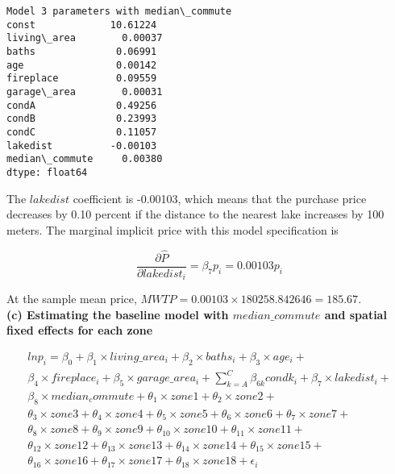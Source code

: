 \documentclass[11pt]{article}
\begin{document}
    \begin{Verbatim}[commandchars=\\\{\}]
Model 3 parameters with median\_commute
const             10.61224
living\_area        0.00037
baths              0.06991
age                0.00142
fireplace          0.09559
garage\_area        0.00031
condA              0.49256
condB              0.23993
condC              0.11057
lakedist          -0.00103
median\_commute     0.00380
dtype: float64

    \end{Verbatim}

    The \(lakedist\) coefficient is -0.00103, which means that the purchase
price decreases by 0.10 percent if the distance to the nearest lake
increases by 100 meters. The marginal implicit price with this model
specification is

\begin{equation}
\frac{\partial \widehat{P}}{\partial lakedist_i} = \beta_7 p_i = 0.00103 p_i
\end{equation}

 At the sample mean price,
\(MWTP = 0.00103 \times 180258.842646 = 185.67\).\\

    \textbf{(c) Estimating the baseline model with \(median\_commute\) and spatial fixed
effects for each zone}

\begin{multline*}
ln p_i = \beta_0 + \beta_1 \times living\_area_i + 
\beta_2 \times baths_i + \beta_3 \times age_i + \\
\beta_4 \times fireplace_i + \beta_5 \times garage\_area_i +
\sum_{k=A}^{C} \beta_{6k}condk_i + \beta_7 \times lakedist_i +\\
\beta_8 \times median_commute + 
\theta_1 \times zone1 +\theta_2 \times zone2 +\\
\theta_3 \times zone3+\theta_4 \times zone4+\theta_5 \times zone5+
\theta_6 \times zone6+\theta_7 \times zone7+\\
\theta_8 \times zone8+
\theta_9 \times zone9+\theta_{10} \times zone10+\theta_{11} \times zone11+\\
\theta_{12} \times zone12+\theta_{13} \times zone13+\theta_{14} \times zone14+
\theta_{15} \times zone15+\\
\theta_{16} \times zone16+\theta_{17} \times zone17+
\theta_{18} \times zone18 + \epsilon_i
\end{multline*}
\end{document}
